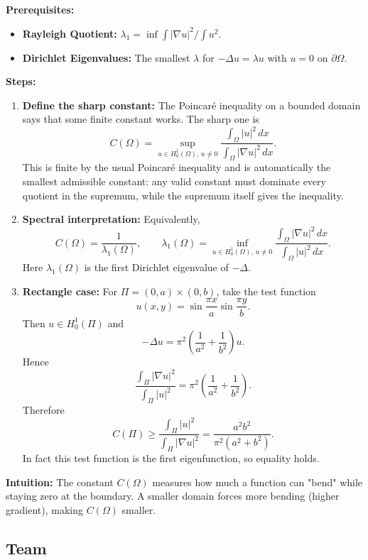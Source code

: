 \begin{solution}
\textbf{Prerequisites:}
\begin{itemize}
    \item \textbf{Rayleigh Quotient:} $\lambda_1 = \inf \int |\nabla u|^2 / \int u^2$.
    \item \textbf{Dirichlet Eigenvalues:} The smallest $\lambda$ for $-\Delta u = \lambda u$ with $u=0$ on $\partial \Omega$.
\end{itemize}

\textbf{Steps:}
\begin{enumerate}
    \item \textbf{Define the sharp constant:} The Poincar\'e inequality on a bounded domain says that some finite constant works. The sharp one is
    \[
    C(\Omega)
    =
    \sup_{u\in H_0^1(\Omega),\,u\neq0}
    \frac{\int_\Omega |u|^2\,dx}{\int_\Omega |\nabla u|^2\,dx}.
    \]
    This is finite by the usual Poincar\'e inequality and is automatically the smallest admissible constant: any valid constant must dominate every quotient in the supremum, while the supremum itself gives the inequality.
    \item \textbf{Spectral interpretation:} Equivalently,
    \[
    C(\Omega)=\frac{1}{\lambda_1(\Omega)},\qquad
    \lambda_1(\Omega)=
    \inf_{u\in H_0^1(\Omega),\,u\neq0}
    \frac{\int_\Omega |\nabla u|^2\,dx}{\int_\Omega |u|^2\,dx}.
    \]
    Here $\lambda_1(\Omega)$ is the first Dirichlet eigenvalue of $-\Delta$.
    \item \textbf{Rectangle case:} For $\Pi=(0,a)\times(0,b)$, take the test function
    \[
    u(x,y)=\sin\frac{\pi x}{a}\sin\frac{\pi y}{b}.
    \]
    Then $u\in H_0^1(\Pi)$ and
    \[
    -\Delta u=\pi^2\left(\frac1{a^2}+\frac1{b^2}\right)u.
    \]
    Hence
    \[
    \frac{\int_\Pi |\nabla u|^2}{\int_\Pi |u|^2}
    =\pi^2\left(\frac1{a^2}+\frac1{b^2}\right).
    \]
    Therefore
    \[
    C(\Pi)
    \geq
    \frac{\int_\Pi |u|^2}{\int_\Pi |\nabla u|^2}
    =
    \frac{a^2b^2}{\pi^2(a^2+b^2)}.
    \]
    In fact this test function is the first eigenfunction, so equality holds.
\end{enumerate}

\textbf{Intuition:}
The constant $C(\Omega)$ measures how much a function can "bend" while staying zero at the boundary. A smaller domain forces more bending (higher gradient), making $C(\Omega)$ smaller.
\end{solution}

\subsection{Team}

